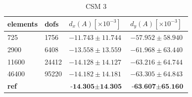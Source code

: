 \begin{table}[H]
\centering
\caption{CSM 3}
\label{my-label}
\begin{tabular}{|l|l|l|l|}
\hline
elements & dofs & $d_x(A) [\times10^{-3}]$ & $d_y(A)[\times10^{-3}]$ \\ \hline
725 & 1756 & $-11.743 \pm 11.744$ & $-57.952 \pm 58.940$ \\ \hline
2900 & 6408 & $-13.558 \pm 13.559$ & $ -61.968 \pm  63.440 $ \\ \hline
11600 & 24412 & $ -14.128 \pm 14.127$ & $-63.216 \pm 64.744 $ \\ \hline
46400 & 95220 & $ -14.182 \pm 14.181 $ & $ -63.305 \pm 64.843 $ \\ \hline
\textbf{ref} &  & $ \textbf{-14.305} \pm \textbf{14.305} $ & $ \textbf{-63.607} \pm  \textbf{65.160} $ \\ \hline
\end{tabular}
\end{table}

